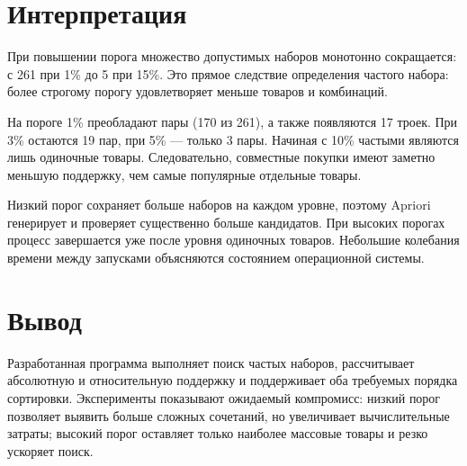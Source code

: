 \documentclass[12pt,a4paper]{article}
\begin{document}
\section{Интерпретация}

При повышении порога множество допустимых наборов монотонно сокращается: с 261 при 1\% до 5 при 15\%. Это прямое следствие определения частого набора: более строгому порогу удовлетворяет меньше товаров и комбинаций.

На пороге 1\% преобладают пары (170 из 261), а также появляются 17 троек. При 3\% остаются 19 пар, при 5\% --- только 3 пары. Начиная с 10\% частыми являются лишь одиночные товары. Следовательно, совместные покупки имеют заметно меньшую поддержку, чем самые популярные отдельные товары.

Низкий порог сохраняет больше наборов на каждом уровне, поэтому Apriori генерирует и проверяет существенно больше кандидатов. При высоких порогах процесс завершается уже после уровня одиночных товаров. Небольшие колебания времени между запусками объясняются состоянием операционной системы.

\section{Вывод}

Разработанная программа выполняет поиск частых наборов, рассчитывает абсолютную и относительную поддержку и поддерживает оба требуемых порядка сортировки. Эксперименты показывают ожидаемый компромисс: низкий порог позволяет выявить больше сложных сочетаний, но увеличивает вычислительные затраты; высокий порог оставляет только наиболее массовые товары и резко ускоряет поиск.
\end{document}
